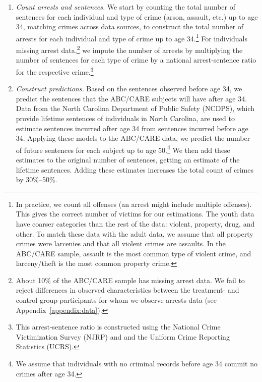 \begin{enumerate}
\item \textit{Count arrests and sentences.} We start by counting the total number of sentences for each individual and type of crime (arson, assault, etc.) up to age 34, matching crimes across data sources, to construct the total number of  arrests for each individual and type of crime up to age 34.\footnote{In practice, we count all offenses (an arrest might include multiple offenses). This gives the correct number of victims for our estimations. The youth data have coarser categories than the rest of the data: violent, property, drug, and other. To match these data with the adult data, we assume that all property crimes were larcenies and that all violent crimes are assaults. In the ABC/CARE sample, assault is the most common type of violent crime, and larceny/theft is the most common property crime.} For individuals missing arrest data,\footnote{About 10\% of the ABC/CARE sample has missing arrest data. We fail to reject differences in observed characteristics between the treatment- and control-group participants for whom we observe arrests data (see Appendix~\ref{appendix:data}).} we impute the number of arrests by multiplying the number of sentences for each type of crime by a national arrest-sentence ratio for the respective crime.\footnote{This arrest-sentence ratio is constructed using the National Crime Victimization Survey (NJRP) and and the Uniform Crime Reporting Statistics (UCRS).}

\item \textit{Construct predictions.} Based on the sentences observed before age 34, we predict the sentences that the ABC/CARE subjects will have after age 34. Data from the North Carolina Department of Public Safety (NCDPS), which provide lifetime sentences of individuals in North Carolina, are used to estimate sentences incurred after age 34 from sentences incurred before age 34. Applying these models to the ABC/CARE data, we predict the number of future sentences for each subject up to age 50.\footnote{We assume that individuals with no criminal records before age 34 commit no crimes after age 34.} We then add these estimates to the original number of sentences, getting an estimate of the lifetime sentences. Adding these estimates increases the total count of crimes by 30\%--50\%.


\end{enumerate}
